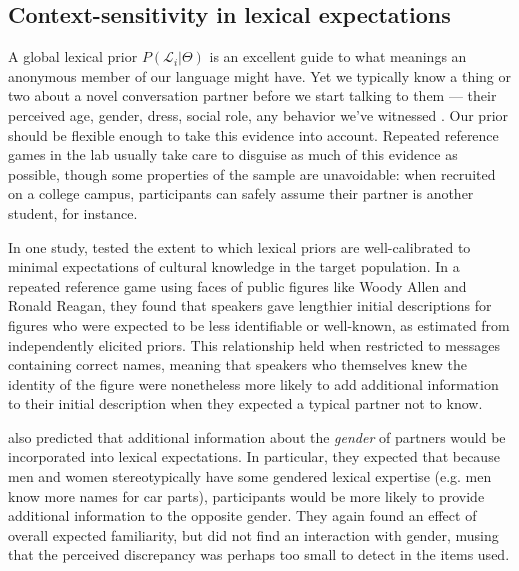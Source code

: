 \subsection{Context-sensitivity in lexical expectations}

A global lexical prior $P(\mathcal{L}_i | \Theta)$ is an excellent guide to what meanings an anonymous member of our language might have. Yet we typically know a thing or two about a novel conversation partner before we start talking to them --- their perceived age, gender, dress, social role, any behavior we've witnessed \cite{Davidson86_DerangementOfEpitaphs,KleinschmidtJaeger15_RobustSpeechPerception}. Our prior should be flexible enough to take this evidence into account. Repeated reference games in the lab usually take care to disguise as much of this evidence as possible, though some properties of the sample are unavoidable: when recruited on a college campus, participants can safely assume their partner is another student, for instance. 

In one study,  tested the extent to which lexical priors are well-calibrated to minimal expectations of cultural knowledge in the target population. In a repeated reference game using faces of public figures like Woody Allen and Ronald Reagan, they found that speakers gave lengthier initial descriptions for figures who were expected to be less identifiable or well-known, as estimated from independently elicited priors. This relationship held when restricted to messages containing correct names, meaning that speakers who themselves knew the identity of the figure were nonetheless more likely to add additional information to their initial description when they expected a typical partner not to know. 

 also predicted that additional information about the \emph{gender} of partners would be incorporated into lexical expectations. In particular, they expected that because men and women stereotypically have some gendered lexical expertise (e.g. men know more names for car parts), participants would be more likely to provide additional information to the opposite gender. They again found an effect of overall expected familiarity, but did not find an interaction with gender, musing that the perceived discrepancy was perhaps too small to detect in the items used.

